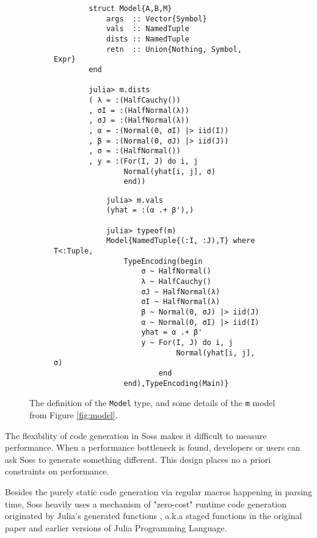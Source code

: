 \documentclass[anonymous=false, %
               format=acmsmall, %
               review=true, %
               screen=true, %
               nonacm=true]{acmart}
\begin{document}
\begin{figure}[t]
    \begin{subfigure}[b]{0.48\textwidth}
        \begin{verbatim}
        struct Model{A,B,M} 
            args  :: Vector{Symbol}
            vals  :: NamedTuple
            dists :: NamedTuple
            retn  :: Union{Nothing, Symbol, Expr}
        end

        julia> m.dists
        ( λ = :(HalfCauchy())
        , σI = :(HalfNormal(λ))
        , σJ = :(HalfNormal(λ))
        , α = :(Normal(0, σI) |> iid(I))
        , β = :(Normal(0, σJ) |> iid(J))
        , σ = :(HalfNormal())
        , y = :(For(I, J) do i, j
                Normal(yhat[i, j], σ)
                end))
        \end{verbatim}

    \end{subfigure}    
    \begin{subfigure}[b]{0.48\textwidth}
        \begin{verbatim}
            julia> m.vals
            (yhat = :(α .+ β'),)

            julia> typeof(m)
            Model{NamedTuple{(:I, :J),T} where T<:Tuple,
                TypeEncoding(begin
                    σ ~ HalfNormal()
                    λ ~ HalfCauchy()
                    σJ ~ HalfNormal(λ)
                    σI ~ HalfNormal(λ)
                    β ~ Normal(0, σJ) |> iid(J)
                    α ~ Normal(0, σI) |> iid(I)
                    yhat = α .+ β'
                    y ~ For(I, J) do i, j
                            Normal(yhat[i, j], σ)
                        end
                end),TypeEncoding(Main)}
        \end{verbatim}
    \end{subfigure}    
    \caption{The definition of the \texttt{Model} type, and some details of the \texttt{m} model from Figure \ref{fig:model}.}
\end{figure}

The flexibility of code generation in Soss makes it difficult to measure performance. When a performance bottleneck is found, developers or users can ask Soss to generate something different. This design places no a priori constraints on performance.


Besides the purely static code generation via regular macros happening in parsing time, Soss heavily uses a mechanism of "zero-cost" runtime code generation originated by Julia's generated functions \cite{bezanson2012julia}, a.k.a staged functions in the original paper and earlier versions of Julia Programming Language.
\end{document}
